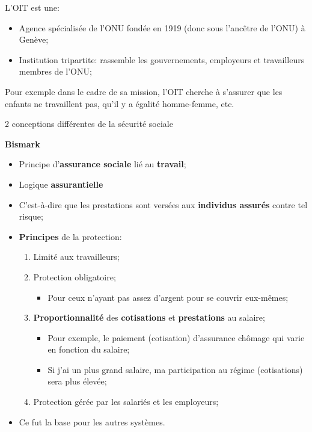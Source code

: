 \documentclass[10pt, french]{article}
\begin{document}
\begin{multicols*}{3}
\begin{definition}
L'OIT est une:
\begin{itemize}
	\item	Agence spécialisée de l'ONU fondée en 1919 (donc sous l'ancêtre de l'ONU) à Genève;
	\item	Institution tripartite: rassemble les gouvernements, employeurs et travailleurs membres de l'ONU;
\end{itemize}

Pour exemple dans le cadre de sa mission, l'OIT cherche à s'assurer que les enfants ne travaillent pas, qu'il y a égalité homme-femme, etc.
\end{definition}

\begin{conceptgen}{2 conceptions différentes de la sécurité sociale}
\begin{center}
\textbf{Bismark}
\end{center}
\begin{itemize}[leftmargin = *]
	\item	Principe d'\textbf{assurance sociale} lié au \textbf{travail};
	\item	Logique \textbf{assurantielle}
	\item[]	C'est-à-dire que les prestations sont versées aux \textbf{individus assurés} contre tel risque;
	\item	\textbf{Principes} de la protection:
		\begin{enumerate}
		\item	Limité aux travailleurs;
		\item	Protection obligatoire;
			\begin{itemize}
			\item	Pour ceux n'ayant pas assez d'argent pour se couvrir eux-mêmes;
			\end{itemize}
		\item	\textbf{Proportionnalité} des \textbf{cotisations} et \textbf{prestations} au salaire;
			\begin{itemize}
			\item	Pour exemple, le paiement (cotisation) d'assurance chômage qui varie en fonction du salaire;
			\item	Si j'ai un plus grand salaire, ma participation au régime (cotisations) sera plus élevée;
			\end{itemize}
			\item	Protection gérée par les salariés et les employeurs;
		\end{enumerate}
	\item	Ce fut la base pour les autres systèmes.
\end{itemize}
\tcbline


\end{conceptgen}
\end{multicols*}
\end{document}
